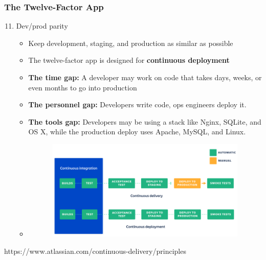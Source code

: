 \documentclass{beamer}
\begin{document}
	\begin{frame}
		\frametitle{The Twelve-Factor App}
		\begin{enumerate}
			\setcounter{enumi}{10}
			\item Dev/prod parity \\
			\begin{itemize}
				\item<1->[] \scriptsize{Keep development, staging, and production as similar as possible}
				\item<1-> \scriptsize {The twelve-factor app is designed for \textbf{continuous deployment}}
				\item<2-> \scriptsize {\textbf{The time gap:} A developer may work on code that takes days, weeks, or even months to go into production}
				\item<3-> \scriptsize {\textbf{The personnel gap:} Developers write code, ops engineers deploy it.}
				\item<4-> \scriptsize {\textbf{The tools gap:} Developers may be using a stack like Nginx, SQLite, and OS X, while the production deploy uses Apache, MySQL, and Linux.}
				\item<1->[] 
				\begin{figure}[h]
					\includegraphics[width=100mm,height=48mm ,scale=1]{img/cdv-cdep.png}
				\end{figure}
			\end{itemize}
		\end{enumerate}
		\tiny{https://www.atlassian.com/continuous-delivery/principles}
	\end{frame}
\end{document}

